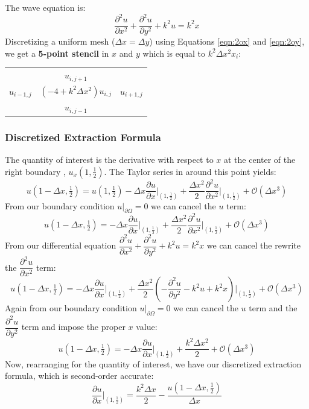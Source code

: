 \documentclass[10pt]{article}		%
\numberwithin{equation}{section}
\newcommand{\pder}[2]{\frac{\partial#1}{\partial#2}}			%
\newcommand{\psder}[2]{\dfrac{\partial^2#1}{\partial#2^2}}		%
\begin{document}
The wave equation is:
\begin{equation}
\psder{u}{x} + \psder{u}{y} +  k^2u = k^2x
\end{equation}
Discretizing a uniform mesh ($\Delta x = \Delta y$) using Equations \ref{eqn:2ox} and \ref{eqn:2oy}, we get a \textbf{5-point stencil} in $x$ and $y$ which is equal to $k^2 \Delta x^2 x_i$:

\begin{table}[H]
	\begin{tabular}{ccc}
		 & $u_{i, j+1}$ &  \\
		$u_{i-1, j}$ & $(-4+k^2\Delta x^2)u_{i, j}$ & $u_{i+1, j}$ \\
		 & $u_{i, j-1}$ & 
	\end{tabular}
\end{table}

\subsubsection{Discretized Extraction Formula}
The quantity of interest is the derivative with respect to $x$ at the center of the right boundary , $u_x(1, \tfrac{1}{2})$.
The Taylor series in around this point yields:
\begin{equation}
u(1-\Delta x, \tfrac{1}{2}) = u(1, \tfrac{1}{2}) - \Delta x \pder{u}{x}\Big|_{\left(1, \tfrac{1}{2}\right)} + \frac{\Delta x^2}{2} \psder{u}{x}\Big|_{\left(1, \tfrac{1}{2}\right)} + \mathcal{O}(\Delta x^3)
\end{equation}
From our boundary condition $u \big|_{\partial \Omega} = 0 $ we can cancel the $u$ term:
\begin{equation}
u(1-\Delta x, \tfrac{1}{2}) = - \Delta x \pder{u}{x}\Big|_{\left(1, \tfrac{1}{2}\right)} + \frac{\Delta x^2}{2} \psder{u}{x}\Big|_{\left(1, \tfrac{1}{2}\right)} + \mathcal{O}(\Delta x^3)
\end{equation}
From our differential equation $\psder{u}{x} + \psder{u}{y} +  k^2u = k^2x$ we can cancel the rewrite the $\psder{u}{x}$ term:
\begin{equation}
u(1-\Delta x, \tfrac{1}{2}) = - \Delta x \pder{u}{x}\Big|_{\left(1, \tfrac{1}{2}\right)} + \frac{\Delta x^2}{2} \left(- \psder{u}{y} -  k^2u + k^2x\right)\Big|_{\left(1, \tfrac{1}{2}\right)} + \mathcal{O}(\Delta x^3)
\end{equation}
Again from our boundary condition $u \big|_{\partial \Omega} = 0 $ we can cancel the $u$ term and the $\psder{u}{y}$ term and impose the proper $x$ value:
\begin{equation}
u(1-\Delta x, \tfrac{1}{2}) = - \Delta x \pder{u}{x}\Big|_{\left(1, \tfrac{1}{2}\right)} + \frac{k^2\Delta x^2}{2} + \mathcal{O}(\Delta x^3)
\end{equation}
Now, rearranging for the quantity of interest, we have our discretized extraction formula, which is second-order accurate:
\begin{equation}
\pder{u}{x}\Big|_{\left(1, \tfrac{1}{2}\right)} = \frac{k^2\Delta x}{2} -\frac{u(1-\Delta x, \tfrac{1}{2})}{\Delta x}
\end{equation}
\end{document}
